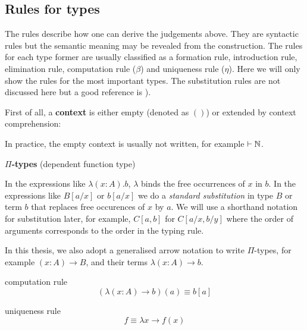 \subsection{Rules for types}\label{typerule}


The rules describe how one can derive the judgements above. They are syntactic rules but the semantic meaning may be revealed from the construction.
The rules for each type former are usually classified as a formation rule, introduction rule, elimination rule, computation rule ($\beta$) and uniqueness rule ($\eta$). Here we will only show the rules for the most important types. The substitution rules are not discussed here but a good reference is \cite{hof:phd}).


First of all, a \textbf{context} is either empty (denoted as $()$) or extended by context comprehension:


In practice, the empty context is usually not written, for example $\vdash \mathbb{N}$.

\textbf{$\Pi$-types} (dependent function type)

\begin{multicols}{2}
\columnbreak
{}
\end{multicols}


In the expressions like $\lambda (x:A).b$, $\lambda$ binds the free occurrences of $x$ in $b$.
In the expressions like $B[a/x]$ or $b[a/x]$ we do a \emph{standard substitution} in type $B$ or term $b$ that replaces free occurences of $x$ by $a$. We will use a shorthand notation for substitution later, for example, $C[a,b]$ for $C[a/x,b/y]$ where the order of arguments corresponds to the order in the typing rule.

In this thesis, we also adopt a generalised arrow notation to write $\Pi$-types, for example $(x : A) \to B$, and their terms $\lambda (x: A) \to b$.

\begin{multicols}{2}
computation rule
$$(\lambda (x:A) \to b)(a) \equiv b[a]$$

\columnbreak

uniqueness rule
$$f \equiv \lambda x \to f(x) $$
\end{multicols}

